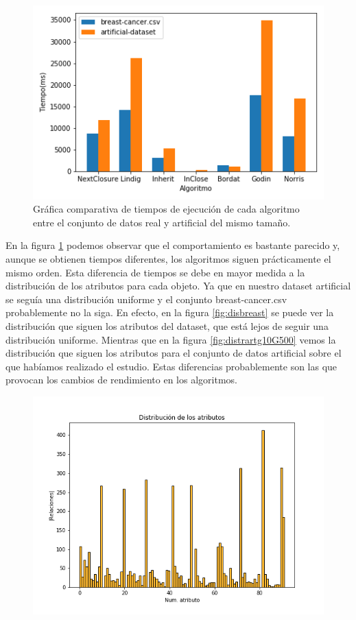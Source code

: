 \documentclass[oneside,openright,titlepage,numbers=noenddot,openany,headinclude,footinclude=true,
cleardoublepage=empty,abstractoff,BCOR=5mm,paper=a4,fontsize=12pt,main=spanish]{scrreprt}
\begin{document}
\begin{itemize}
\begin{figure}[H]
  \centering
  \includegraphics[scale=0.6]{images/comparative-breast.png}
\caption{Gráfica comparativa de tiempos de ejecución de cada algoritmo entre el conjunto de datos real y artificial del mismo tamaño. }
\label{fig:compbreast}
\end{figure}

En la figura \ref{fig:compbreast} podemos observar que el comportamiento es bastante parecido y, aunque se obtienen tiempos diferentes, los algoritmos siguen prácticamente el mismo orden. Esta diferencia de tiempos se debe en mayor medida a la distribución de los atributos para cada objeto. Ya que en nuestro dataset artificial se seguía una distribución uniforme y el conjunto breast-cancer.csv probablemente no la siga. En efecto, en la figura \ref{fig:disbreast} se puede ver la distribución que siguen los atributos del dataset, que está lejos de seguir una distribución uniforme. Mientras que en la figura \ref{fig:distrartg10G500} vemos la distribución que siguen los atributos para el conjunto de datos artificial sobre el que habíamos realizado el estudio. Estas diferencias probablemente son las que provocan los cambios de rendimiento en los algoritmos.

\begin{figure}[H]
  \centering
  \includegraphics[scale=0.4]{images/distribution-breast.png}
 

\end{figure}
\end{itemize}
\end{document}

